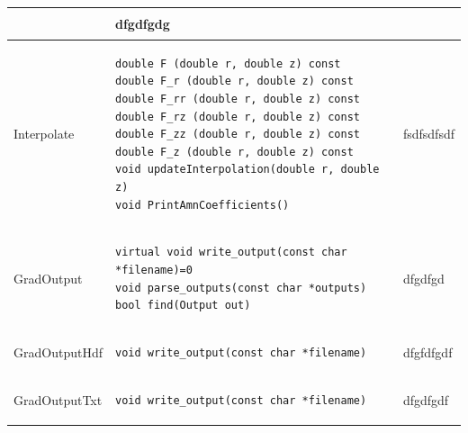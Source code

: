 \documentclass[paper=letter, fontsize=11pt]{scrartcl} %
\begin{document}
\begin{centering}
\begin{tabular}{ | m{2.6cm} | p{9.0cm} | p{6cm}|}
\begin{lstlisting}[belowskip=-\baselineskip, aboveskip=-0.5\baselineskip]
\end{lstlisting}
    & dfgdfgdg \\ 
    \hline Interpolate & 
\begin{lstlisting}[belowskip=-\baselineskip, aboveskip=-0.5\baselineskip]
double F (double r, double z) const
double F_r (double r, double z) const
double F_rr (double r, double z) const
double F_rz (double r, double z) const
double F_zz (double r, double z) const
double F_z (double r, double z) const
void updateInterpolation(double r, double z)
void PrintAmnCoefficients()
\end{lstlisting}
    & fsdfsdfsdf \\ 
    \hline GradOutput & 
\begin{lstlisting}[belowskip=-\baselineskip, aboveskip=-0.5\baselineskip]
virtual void write_output(const char *filename)=0
void parse_outputs(const char *outputs)
bool find(Output out)
\end{lstlisting}
    & dfgdfgd \\ 
   \hline GradOutputHdf & 
\begin{lstlisting}[belowskip=-\baselineskip, aboveskip=-0.5\baselineskip]
void write_output(const char *filename)
\end{lstlisting}
     & dfgfdfgdf \\ 
    \hline GradOutputTxt &
\begin{lstlisting}[belowskip=-\baselineskip, aboveskip=-0.5\baselineskip]
void write_output(const char *filename)
\end{lstlisting}
    & dfgdfgdf \\ 
    \hline
\end{tabular}
\end{centering}
\end{document}
